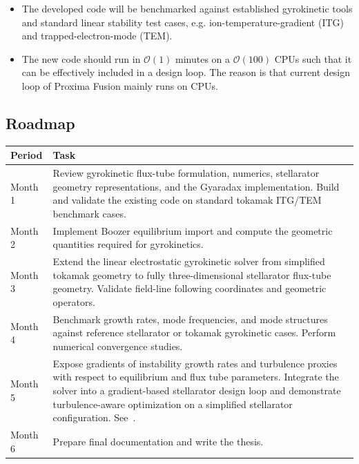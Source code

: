 \documentclass[11pt,a4paper,oneside]{article}
\begin{document}
\begin{itemize}
    \item The developed code will be benchmarked against established gyrokinetic tools and standard linear stability test cases, e.g. ion-temperature-gradient (ITG) and trapped-electron-mode (TEM).
    \item The new code should run in $\mathcal{O}(1)$ minutes on a $\mathcal{O}(100)$ CPUs such that it can be effectively included in a design loop. The reason is that current design loop of Proxima Fusion mainly runs on CPUs.
\end{itemize}

\subsection*{Roadmap}

\begin{table}[H]
\centering
\begin{tabular}{p{} p{}}
\hline
\textbf{Period} &  \textbf{Task} \\
\hline
Month 1 &
Review gyrokinetic flux-tube formulation, numerics, stellarator geometry representations, and the Gyaradax implementation. Build and validate the existing code on standard tokamak ITG/TEM benchmark cases. \\

Month 2 &
Implement Boozer equilibrium import and compute the geometric quantities required for gyrokinetics. \\

Month 3 &
Extend the linear electrostatic gyrokinetic solver from simplified tokamak geometry to fully three-dimensional stellarator flux-tube geometry. Validate field-line following coordinates and geometric operators. \\

Month 4 &
Benchmark growth rates, mode frequencies, and mode structures against reference stellarator or tokamak gyrokinetic cases. Perform numerical convergence studies. \\
Month 5 &
Expose gradients of instability growth rates and turbulence proxies with respect to equilibrium and flux tube parameters.  Integrate the solver into a gradient-based stellarator design loop and demonstrate turbulence-aware optimization on a simplified stellarator configuration. 
See~\cite{kim2024optimization,jorge2024direct}.\\
Month 6 &
Prepare final documentation and write the thesis.
\\
\hline
\end{tabular}
\end{table}
\end{document}
